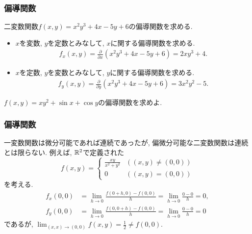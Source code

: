 

\begin{frame}
\frametitle{偏導関数}


二変数関数$f(x,y)=x^2y^3+4x-5y+6$の偏導関数を求める. 

\begin{itemize}
\item $x$を変数, $y$を定数とみなして, $x$に関する偏導関数を求める. 
\begin{align*}
f_x(x,y)=\frac{\partial}{\partial x}(x^2y^3+4x-5y+6) = 2xy^3+4. 
\end{align*}
\item $x$を定数, $y$を変数とみなして, $y$に関する偏導関数を求める. 
\begin{align*}
f_y(x,y)=\frac{\partial}{\partial y}(x^2y^3+4x-5y+6) = 3x^2y^2-5. 
\end{align*}
\end{itemize}

\begin{Prob}
$f(x,y)=xy^2+\sin x + \cos y$の偏導関数を求めよ. 
\end{Prob}

\end{frame}





\begin{frame}
\frametitle{偏導関数}

一変数関数は微分可能であれば連続であったが, 偏微分可能な二変数関数は連続とは限らない. 
例えば, $\mathbb{R}^2$で定義された
$$
f(x,y)=
\begin{cases}
\frac{xy}{x^2+y^2}  & ((x,y) \ne (0,0)) \\
0 & ((x,y)=(0,0)) 
 \end{cases}
$$
を考える. 
\begin{align*}
f_x(0,0) &=\lim_{h\to 0}\frac{f(0+h,0)-f(0,0)}{h}=\lim_{h\to 0}\frac{0-0}{h}=0, \\
f_y(0,0) &=\lim_{h\to 0}\frac{f(0,0+h)-f(0,0)}{h}=\lim_{h\to 0}\frac{0-0}{h}=0
\end{align*}
であるが, $\displaystyle \lim_{(x,x)\to (0,0)} f(x,y)= \frac{1}{2} \ne f(0,0)$. 

\end{frame}



